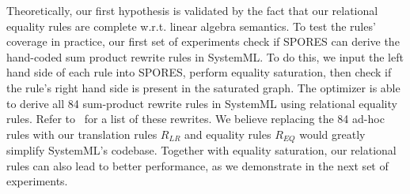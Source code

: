 Theoretically, our first hypothesis is validated by the fact that our relational
equality rules are complete w.r.t. linear algebra semantics. To test the rules' coverage in
practice, our first set of experiments check if SPORES
can derive the hand-coded sum product rewrite rules in SystemML. To do this, we
input the left hand side of each rule into SPORES, perform equality
saturation, then check if the rule's right hand side is present in the saturated
graph. The optimizer is able to derive
all 84 sum-product rewrite rules in SystemML using relational equality rules. 
Refer to~\cite{SPORESarxiv} for a list of these rewrites. 
We believe replacing the 84 ad-hoc
rules with our translation rules $R_{LR}$ and equality rules $R_{EQ}$ would greatly
simplify SystemML's codebase. Together with equality saturation, our relational
rules can also lead to better performance, as we demonstrate in the next set of
 experiments.



